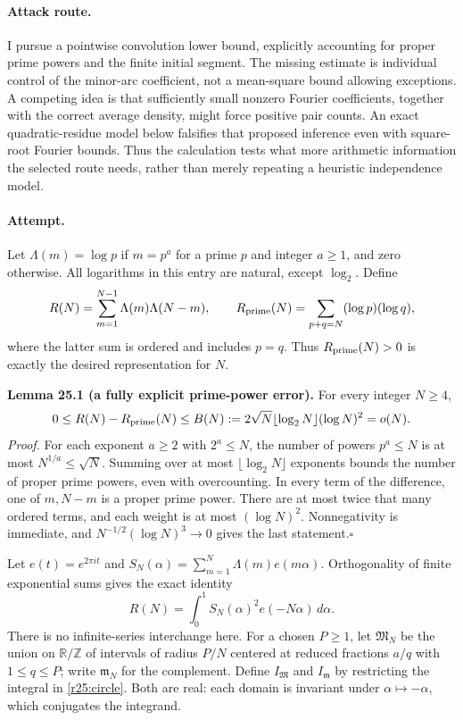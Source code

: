 \documentclass[11pt,a4paper]{article}
\newcommand{\Z}{\mathbb{Z}}
\newcommand{\R}{\mathbb{R}}
\numberwithin{equation}{section}
\begin{document}
\paragraph{Attack route.}
I pursue a pointwise convolution lower bound, explicitly accounting for
proper prime powers and the finite initial segment. The missing estimate
is individual control of the minor-arc coefficient, not a mean-square
bound allowing exceptions. A competing idea is that sufficiently small
nonzero Fourier coefficients, together with the correct average density,
might force positive pair counts. An exact quadratic-residue model below
falsifies that proposed inference even with square-root Fourier bounds.
Thus the calculation tests what more arithmetic information the selected
route needs, rather than merely repeating a heuristic independence model.

\paragraph{Attempt.}
Let $\Lambda(m)=\log p$ if $m=p^a$ for a prime $p$ and integer $a\ge1$,
and zero otherwise. All logarithms in this entry are natural, except
$\log_2$. Define
\[
 R(N)=\sum_{m=1}^{N-1}\Lambda(m)\Lambda(N-m),\qquad
 R_{\rm prime}(N)=\sum_{p+q=N}(\log p)(\log q),
\]
where the latter sum is ordered and includes $p=q$. Thus
$R_{\rm prime}(N)>0$ is exactly the desired representation for $N$.

\textbf{Lemma 25.1 (a fully explicit prime-power error).}
For every integer $N\ge4$,
\begin{equation}\label{r25:powers}
 0\le R(N)-R_{\rm prime}(N)
 \le B(N):=2\sqrt N\lfloor\log_2N\rfloor(\log N)^2=o(N).
\end{equation}
\emph{Proof.} For each exponent $a\ge2$ with $2^a\le N$, the number
of powers $p^a\le N$ is at most $N^{1/a}\le\sqrt N$. Summing over at
most $\lfloor\log_2N\rfloor$ exponents bounds the number of proper
prime powers, even with overcounting. In every term of the difference,
one of $m,N-m$ is a proper prime power. There are at most twice that
many ordered terms, and each weight is at most $(\log N)^2$.
Nonnegativity is immediate, and $N^{-1/2}(\log N)^3\to0$ gives the
last statement.\hfill$\square$

Let $e(t)=e^{2\pi it}$ and
$S_N(\alpha)=\sum_{m=1}^{N}\Lambda(m)e(m\alpha)$. Orthogonality of
finite exponential sums gives the exact identity
\begin{equation}\label{r25:circle}
       R(N)=\int_0^1S_N(\alpha)^2e(-N\alpha)\,d\alpha.
\end{equation}
There is no infinite-series interchange here. For a chosen $P\ge1$,
let $\mathfrak M_N$ be the union on $\R/\Z$ of intervals of radius
$P/N$ centered at reduced fractions $a/q$ with $1\le q\le P$;
write $\mathfrak m_N$ for the complement. Define $I_{\mathfrak M}$
and $I_{\mathfrak m}$ by restricting the integral in
\eqref{r25:circle}. Both are real: each domain is invariant under
$\alpha\mapsto-\alpha$, which conjugates the integrand.
\end{document}
